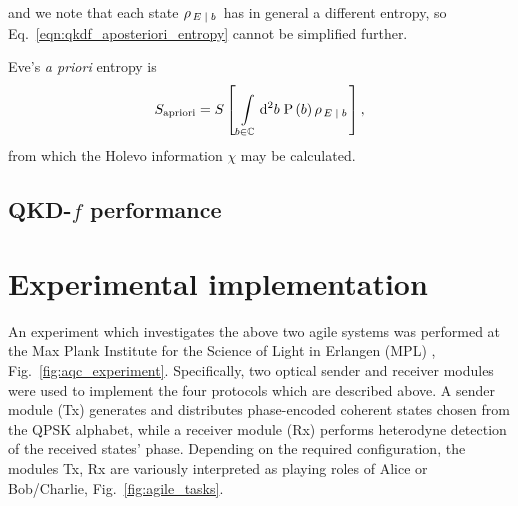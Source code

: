 \noindent and we note that each state $\rho_{\left.E\; \middle| \; b \right.}$ has in general a different entropy, so Eq.~\ref{eqn:qkdf_aposteriori_entropy} cannot be simplified further. 

Eve's \emph{a priori} entropy is
\begin{equation}\label{eqn:qkdf_apriori_entropy}
S_{\text{apriori}} = S\left[\, \int\limits_{b \in \mathbb{C}} \mathop{}\!\mathrm{d^2} b \; \text{P}\left(b\right) \rho_{\left. E \; \middle| \; b \right.}\right],
\end{equation}
from which the Holevo information $\chi$ may be calculated.

\subsection{QKD-$f$ performance}



\section{Experimental implementation}\label{sec:aqc_experiment}

An experiment which investigates the above two agile systems was performed at the Max Plank Institute for the Science of Light in Erlangen (MPL) \cite{Richter2020}, Fig.~\ref{fig:aqc_experiment}. Specifically, two optical sender and receiver modules were used to implement the four protocols which are described above. A sender module (Tx) generates and distributes phase-encoded coherent states chosen from the QPSK alphabet, while a receiver module (Rx) performs heterodyne detection of the received states' phase. Depending on the required configuration, the modules Tx, Rx are variously interpreted as playing roles of Alice or Bob/Charlie, Fig.~\ref{fig:agile_tasks}. 

